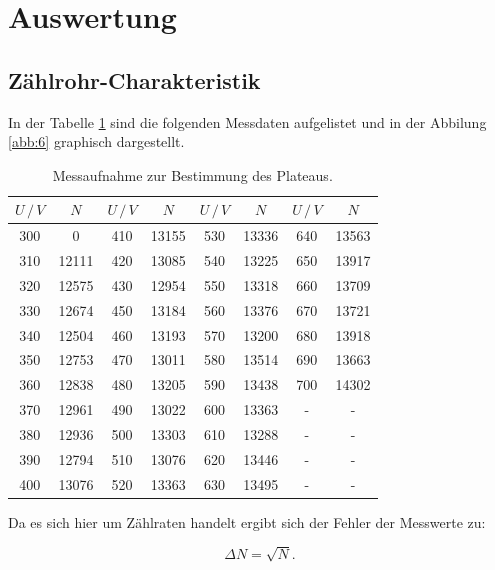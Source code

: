 \section{Auswertung}
\subsection{Zählrohr-Charakteristik}
In der Tabelle \ref{tab:1} sind die folgenden Messdaten aufgelistet und in
der Abbilung \ref{abb:6} graphisch dargestellt.
\begin{table}[H]
  \centering
  \caption{Messaufnahme zur Bestimmung des Plateaus.}
  \label{tab:1}
  \begin{tabular}{c c c c c c c c}
    \toprule
    $U \, /\, V$ & $N$ & $U \, /\, V$ & $N$ & $U \, /\, V$ & $N$ & $U \, /\, V$ &$N$ \\
    \midrule
\cellcolor{red}300 & \cellcolor{red}0 &410 & 13155 &530& 13336 &640& 13563\\
    310 & 12111 &420 & 13085 &540& 13225 &650& 13917\\
    320 & 12575 &430 & 12954 &550& 13318 &660& 13709\\
    330 & 12674 &450 & 13184 &560& 13376 &670& 13721\\
    340 & 12504 &460 & 13193 &570& 13200 &680& 13918\\
    350 & 12753 &470 & 13011 &580& 13514 &690& 13663\\
    360 & 12838 &480 & 13205 &590& 13438 &700& 14302\\
    370 & 12961 &490 & 13022 &600& 13363 &-& -\\
    380 & 12936 &500 & 13303 &610& 13288 &-& -\\
    390 & 12794 &510 & 13076 &620& 13446 &-& -\\
    400 & 13076 &520 & 13363 &630& 13495 &-& -\\
    \bottomrule
  \end{tabular}
\end{table}

Da es sich hier um Zählraten handelt ergibt sich der Fehler der Messwerte zu:

\begin{equation*}
  \Delta N = \sqrt{N}.
\end{equation*}

